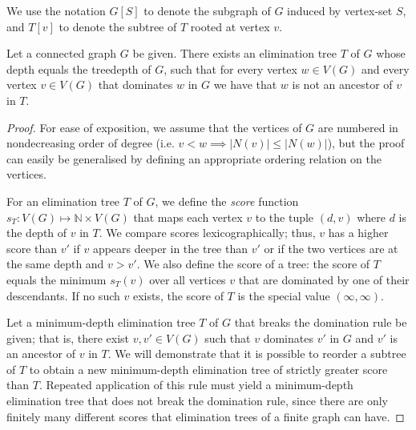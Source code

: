 We use the notation $G[S]$ to denote the subgraph of $G$ induced by
vertex-set $S$, and $T[v]$ to denote the subtree of $T$ rooted at vertex
$v$.

\begin{theorem}
Let a connected graph $G$ be given.  There exists an elimination
tree $T$ of $G$ whose depth equals the treedepth of $G$, such
that for every vertex $w \in V(G)$ and every vertex $v \in V(G)$ that
dominates $w$ in $G$ we have that $w$ is not an ancestor of $v$ in $T$.
\end{theorem}

\begin{proof}
For ease
of exposition, we assume that the vertices of $G$ are numbered in nondecreasing
order of degree
(i.e. $v < w \implies |N(v)| \leq |N(w)|$), but the proof can easily be generalised
by defining an appropriate ordering relation on the vertices.

For an elimination tree $T$ of $G$, we define the \emph{score}
function $s_T : V(G) \mapsto \mathbb N \times V(G)$ that maps each
vertex $v$ to the tuple $(d,v)$ where $d$ is the depth of $v$ in $T$.
We compare scores lexicographically; thus, $v$ has a higher score than $v'$
if $v$ appears deeper in the tree than $v'$ or if the two vertices are at
the same depth and $v > v'$.  We also define the score of a tree: the score
of $T$ equals the minimum $s_T(v)$ over all vertices $v$ that are dominated
by one of their descendants.  If no such $v$ exists, the score of $T$
is the special value $(\infty, \infty)$.

Let a minimum-depth elimination tree $T$ of $G$ that breaks the domination
rule be given; that
is, there exist $v,v' \in V(G)$ such that $v$ dominates $v'$ in $G$ and
$v'$ is an ancestor of $v$ in $T$.
We will demonstrate that it is possible to reorder a subtree of $T$ to obtain
a new minimum-depth elimination tree of strictly greater score than $T$.  Repeated
application of this rule must yield a minimum-depth elimination tree that
does not break the domination rule, since there are only finitely many
different scores that elimination trees of a finite graph can have.


\end{proof}
